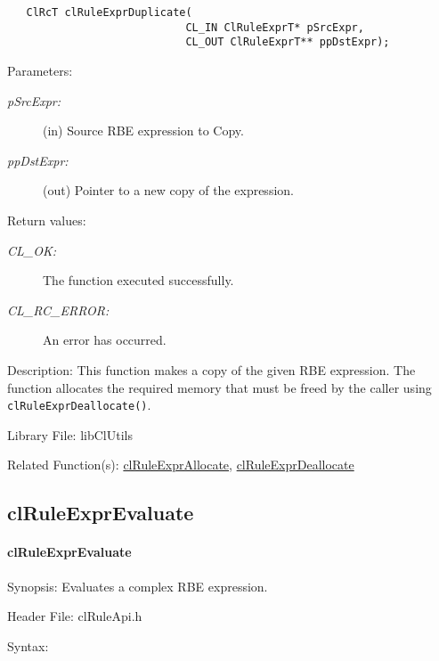 \begin{flushleft}
\begin{Desc}
\footnotesize\begin{verbatim}   ClRcT clRuleExprDuplicate(
              				CL_IN ClRuleExprT* pSrcExpr,
              				CL_OUT ClRuleExprT** ppDstExpr);
\end{verbatim}
\normalsize
\end{Desc}
\begin{Desc}
\item[Parameters:]
\begin{description}
\item[{\em p\-Src\-Expr:}](in) Source RBE expression to Copy. \item[{\em pp\-Dst\-Expr:}](out) Pointer to a new copy of the expression.\end{description}
\end{Desc}
\begin{Desc}
\item[Return values:]
\begin{description}
\item[{\em CL\_\-OK:}]The function executed successfully. 
\item[{\em CL\_\-RC\_\-ERROR:}]An error has occurred.\end{description}
\end{Desc}
\begin{Desc}
\item[Description:]This function makes a copy of the given RBE expression. The function allocates the required memory that must be freed by the caller using 
{\tt{clRuleExprDeallocate()}}.\end{Desc}
\begin{Desc}
\item[Library File:]lib\-Cl\-Utils\end{Desc}
\begin{Desc}
\item[Related Function(s):]\hyperlink{pagerule101}{cl\-Rule\-Expr\-Allocate}, \hyperlink{pagerule101}{cl\-Rule\-Expr\-Deallocate} \end{Desc}
\newpage


\subsection{clRuleExprEvaluate}
\hypertarget{pagerule105}{}\paragraph{cl\-Rule\-Expr\-Evaluate}\label{pagerule105}
\begin{Desc}
\item[Synopsis:]Evaluates a complex RBE expression.\end{Desc}
\begin{Desc}
\item[Header File:]clRuleApi.h\end{Desc}
\begin{Desc}
\item[Syntax:]


\end{Desc}
\end{flushleft}
